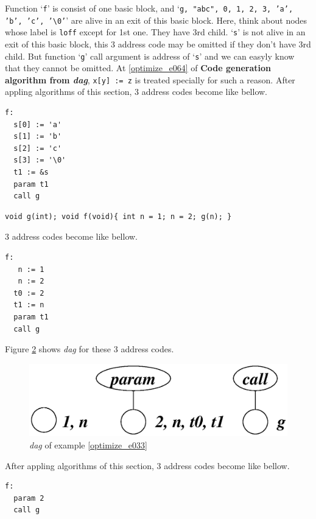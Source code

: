 \begin{Example}
\begin{figure}[htbp]
\begin{center}
\label{optimize_e032}
\end{center}
\end{figure}
Function `{\tt{f}}' is consist of one basic block, and 
`{\tt{g, "abc", 0, 1, 2, 3, 'a', 'b', 'c', '\verb|\|0'}}'
are alive in an exit of this basic block.
Here, think about nodes whose label is {\tt{loff}} except for 1st one.
They have 3rd child.
`{\tt{s}}' is not alive in an exit of this basic block,
this 3 address code may be omitted if they don't have 3rd child.
But function `{\tt{g}}' call argument is address of `{\tt{s}}'
and we can easyly know that they cannot be omitted.
At \ref{optimize_e064} of {\bf Code generation algorithm from {\em dag}},
{\tt{x[y] := z}} is treated specially for such a reason.
After appling algorithms of this section,
3 address codes become like bellow.
\begin{verbatim}
f:
  s[0] := 'a'
  s[1] := 'b'
  s[2] := 'c'
  s[3] := '\0'
  t1 := &s
  param t1
  call g
\end{verbatim}
\end{Example}

\begin{Example}
\label{optimize_e033}
\begin{verbatim}
void g(int); void f(void){ int n = 1; n = 2; g(n); }
\end{verbatim}
3 address codes become like bellow.
\begin{verbatim}
f:
   n := 1
   n := 2
  t0 := 2
  t1 := n
  param t1
  call g
\end{verbatim}
Figure \ref{optimize_e034} shows {\em dag} for these 3 address codes.
\begin{figure}[htbp]
\begin{center}
\includegraphics[width=0.8\linewidth,height=0.247\linewidth]{opt018.eps}
\caption{{\em dag} of example \ref{optimize_e033}}
\label{optimize_e034}
\end{center}
\end{figure}
After appling algorithms of this section,
3 address codes become like bellow.
\begin{verbatim}
f:
  param 2
  call g
\end{verbatim}
\end{Example}

